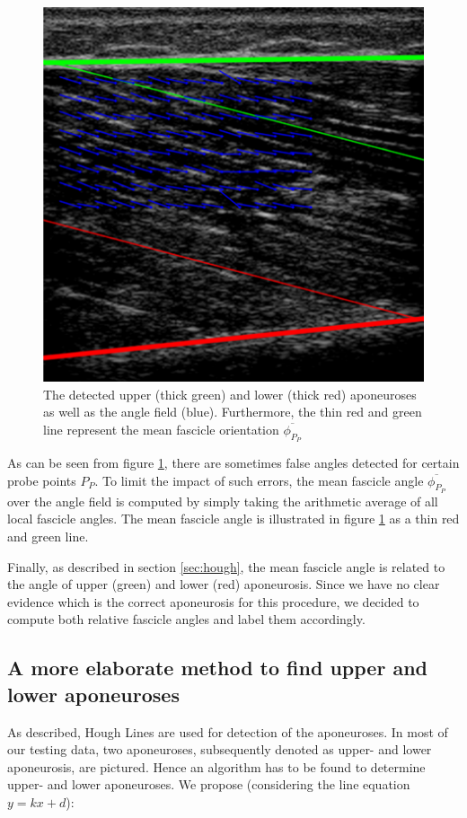 \documentclass[10pt,twocolumn,letterpaper]{article}
\begin{document}
\begin{figure}
	\begin{center}		
		\includegraphics[width=0.7\linewidth]{img/angleField}
	\end{center}
	\caption{The detected upper (thick green) and lower (thick red) aponeuroses as well as the angle field (blue). Furthermore, the thin red and green line represent the mean fascicle orientation $\overline{\phi_{P_P}}$ }
	\label{fig:angleField}
	
\end{figure}

As can be seen from figure \ref{fig:angleField}, there are sometimes false angles detected for certain probe points $P_P$. To limit the impact of such errors, the mean fascicle angle $\overline{\phi_{P_P}}$ over the angle field is computed by simply taking the arithmetic average of all local fascicle angles. The mean fascicle angle is illustrated in figure \ref{fig:angleField} as a thin red and green line.

Finally, as described in section \ref{sec:hough}, the mean fascicle angle is related to the angle of upper (green) and lower (red) aponeurosis. Since we have no clear evidence which is the correct aponeurosis for this procedure, we decided to compute both relative fascicle angles and label them accordingly.  

\subsection{A more elaborate method to find upper and lower aponeuroses}
\label{sec:apofinding}
As described, Hough Lines are used for detection of the aponeuroses. In most of our testing data, two aponeuroses, subsequently denoted as upper- and lower aponeurosis, are pictured. Hence an algorithm has to be found to determine upper- and lower aponeuroses. We propose (considering the line equation $y = kx +d $):
\end{document}
